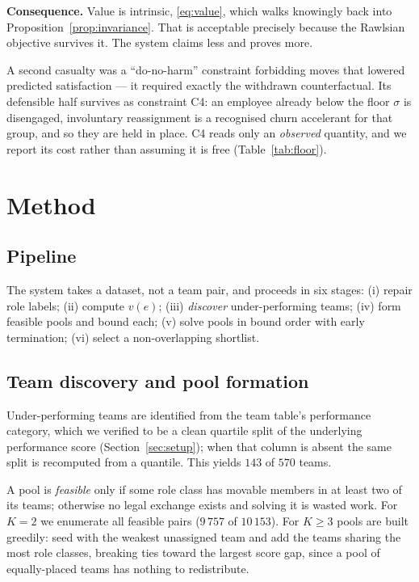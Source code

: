 \documentclass[conference]{IEEEtran}
\newcommand{\vv}{v}
\begin{document}
\noindent\textbf{Consequence.} Value is intrinsic, \eqref{eq:value}, which walks
knowingly back into Proposition~\ref{prop:invariance}. That is acceptable
precisely because the Rawlsian objective survives it. The system claims less and
proves more.

A second casualty was a ``do-no-harm'' constraint forbidding moves that lowered
predicted satisfaction --- it required exactly the withdrawn counterfactual. Its
defensible half survives as constraint C4: an employee already below the floor
$\sigma$ is disengaged, involuntary reassignment is a recognised churn accelerant
for that group, and so they are held in place. C4 reads only an \emph{observed}
quantity, and we report its cost rather than assuming it is free
(Table~\ref{tab:floor}).

\section{Method}\label{sec:method}

\subsection{Pipeline}
The system takes a dataset, not a team pair, and proceeds in six stages:
(i) repair role labels; (ii) compute $\vv(e)$; (iii) \emph{discover}
under-performing teams; (iv) form feasible pools and bound each; (v) solve pools
in bound order with early termination; (vi) select a non-overlapping shortlist.

\subsection{Team discovery and pool formation}
Under-performing teams are identified from the team table's performance category,
which we verified to be a clean quartile split of the underlying performance
score (Section~\ref{sec:setup}); when that column is absent the same split is
recomputed from a quantile. This yields $143$ of $570$ teams.

A pool is \emph{feasible} only if some role class has movable members in at least
two of its teams; otherwise no legal exchange exists and solving it is wasted
work. For $K=2$ we enumerate all feasible pairs ($9\,757$ of $10\,153$). For
$K\geq 3$ pools are built greedily: seed with the weakest unassigned team and add
the teams sharing the most role classes, breaking ties toward the largest score
gap, since a pool of equally-placed teams has nothing to redistribute.
\end{document}

